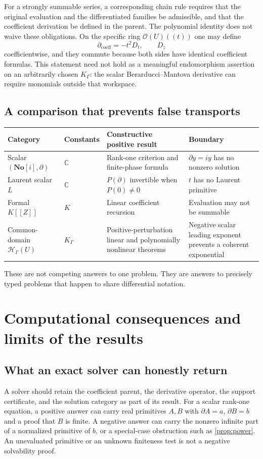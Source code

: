 \documentclass[11pt,letterpaper]{article}
\numberwithin{equation}{section}
\theoremstyle{definition}
\theoremstyle{remark}
\newcommand{\SC}{\mathbf{No}[i]}
\newcommand{\C}{\mathbb C}
\newcommand{\OO}{\mathcal O}
\newcommand{\HH}{\mathscr H}
\newcommand{\D}{\partial}
\begin{document}
For a strongly summable series, a corresponding chain rule requires that
the original evaluation and the differentiated families be admissible, and
that the coefficient derivation be defined in the parent. The polynomial
identity does not waive these obligations. On the specific ring
$\OO(U)((t))$ one may define
\[
 \D_{\mathrm{coeff}}=-t^2D_t,\qquad D_z
\]
coefficientwise, and they commute because both sides have identical
coefficient formulas. This statement need not hold as a meaningful
endomorphism assertion on an arbitrarily chosen $K_\Gamma$: the scalar
Berarducci--Mantova derivative can require monomials outside that workspace.

\subsection{A comparison that prevents false transports}
\begin{center}\small
\begin{tabularx}{\textwidth}{@{}P{0.19\textwidth}YYY@{}}
\toprule
Category & Constants & Constructive positive result & Boundary\\
\midrule
Scalar $(\SC,\D)$ & $\C$ & Rank-one criterion and finite-phase formula &
$\D y=iy$ has no nonzero solution\\[0.5em]
Laurent scalar $L$ & $\C$ & $P(\D)$ invertible when $P(0)\ne0$ &
$t$ has no Laurent primitive\\[0.5em]
Formal $K[[Z]]$ & $K$ & Linear coefficient recursion &
Evaluation may not be summable\\[0.5em]
Common-domain $\HH_\Gamma(U)$ & $K_\Gamma$ & Positive-perturbation linear
and polynomially nonlinear theorems & Negative scalar leading exponent
prevents a coherent exponential\\
\bottomrule
\end{tabularx}
\end{center}

These are not competing answers to one problem. They are answers to
precisely typed problems that happen to share differential notation.

\section{Computational consequences and limits of the results}
\label{sec:computation}

\subsection{What an exact solver can honestly return}
A solver should retain the coefficient parent, the derivative operator,
the support certificate, and the solution category as part of its result.
For a scalar rank-one equation, a positive answer can carry real primitives
$A,B$ with $\D A=a$, $\D B=b$ and a proof that $B$ is finite. A negative
answer can carry the nonzero infinite part of a normalized primitive of
$b$, or a special-case obstruction such as \cref{prop:power}. An unevaluated
primitive or an unknown finiteness test is not a negative solvability proof.
\end{document}
